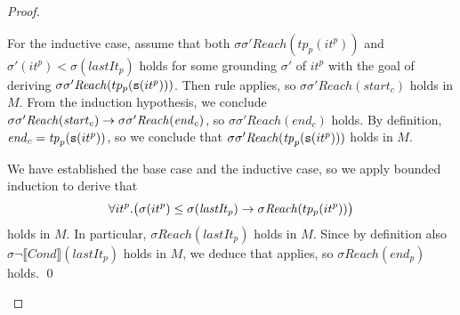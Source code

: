 \begin{proof}
\begin{itemize}
		For the inductive case, assume that both $\sigma\sigma' \mathit{Reach}(tp_p(it^p))$ and $\sigma'(it^p) < \sigma(\mathit{lastIt}_p)$ holds for some grounding $\sigma'$ of $it^p$ with the goal of deriving $\sigma\sigma'\mathit{Reach}(tp_p({\tt s}(it^p)))$. Then rule  applies, so $\sigma\sigma' \mathit{Reach}(\mathit{start}_c)$ holds in $M$. From the induction hypothesis, we conclude $\sigma\sigma' \mathit{Reach}(\mathit{start}_c)\rightarrow \sigma\sigma' \mathit{Reach}(\mathit{end}_c)$, so $\sigma\sigma' \mathit{Reach}(\mathit{end}_c)$ holds. By definition, $\mathit{end}_c = \mathit{tp}_p({\tt s}(it^p))$, so we conclude that $\sigma\sigma' \mathit{Reach}(\mathit{tp}_p({\tt s}(it^p)))$ holds in $M$.
		
		We have established the base case and the inductive case, so we apply bounded induction to derive that 
		$$
		\forall it^p. 
		\big( 
		\sigma(it^p) \leq \sigma(\mathit{lastIt}_p) \rightarrow \sigma\mathit{Reach}(tp_p(it^p))
		\big)
		$$
		holds in $M$.
		In particular,
		$\sigma\mathit{Reach}(\mathit{lastIt}_p)$ holds in
		$M$. Since by definition also $\sigma \neg \llbracket
		\mathit{Cond}\rrbracket(\mathit{lastIt}_p)$ holds in
		$M$, we deduce that  applies, so
		$\sigma\mathit{Reach}(\mathit{end}_p)$ holds.
		\qed
	\end{itemize}
\end{proof}